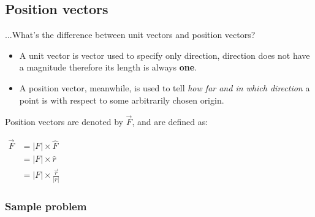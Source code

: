 \documentclass{scrartcl}
\begin{document}





\subsection{Position vectors}
...What's the difference between unit vectors and position vectors?

\begin{itemize}
    \item A unit vector is vector used to specify only direction, direction does not have a magnitude therefore its length is always \textbf{one}.
    \item A position vector, meanwhile, is used to tell \emph{how far and in which direction}
    a point is with respect to some arbitrarily chosen origin.
\end{itemize}

Position vectors are denoted by \(\vec{F}\), and are defined as:

\begin{math}
    \begin{aligned}
        \vec{F} &= |F| \times \hat{F} \\
        &= |F| \times \hat{r} \\
        &= |F| \times \frac{\vec{r}}{|r|}
    \end{aligned}
\end{math}

\subsubsection{Sample problem}
\end{document}
